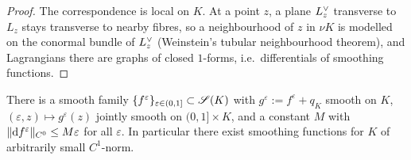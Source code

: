 \begin{proof}
The correspondence is local on $K$. At a point $z$, a plane $L^{\vee}_z$ transverse
to $L_z$ stays transverse to nearby fibres, so a neighbourhood of $z$ in $\nu K$
is modelled on the conormal bundle of $L^{\vee}_z$ (Weinstein's tubular
neighbourhood theorem), and Lagrangians there are graphs of closed $1$-forms,
i.e.\ differentials of smoothing functions.
\end{proof}

\begin{qeightlemma}\label{lem:small-global}
There is a smooth family $\{f^\varepsilon\}_{\varepsilon\in(0,1]}\subset\mathscr S(K)$
with $g^\varepsilon:=f^\varepsilon+q_K$ smooth on $K$, $(\varepsilon,z)\mapsto
g^\varepsilon(z)$ jointly smooth on $(0,1]\times K$, and a constant $M$ with
$\|\mathrm d f^\varepsilon\|_{C^0}\le M\varepsilon$ for all $\varepsilon$. In
particular there exist smoothing functions for $K$ of arbitrarily small $C^1$-norm.
\end{qeightlemma}

